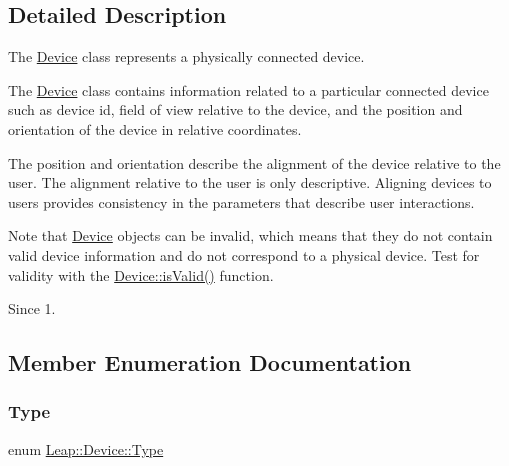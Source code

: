 \subsection{Detailed Description}
The \hyperlink{class_leap_1_1_device}{Device} class represents a physically connected device.

The \hyperlink{class_leap_1_1_device}{Device} class contains information related to a particular connected device such as device id, field of view relative to the device, and the position and orientation of the device in relative coordinates.

The position and orientation describe the alignment of the device relative to the user. The alignment relative to the user is only descriptive. Aligning devices to users provides consistency in the parameters that describe user interactions.

Note that \hyperlink{class_leap_1_1_device}{Device} objects can be invalid, which means that they do not contain valid device information and do not correspond to a physical device. Test for validity with the \hyperlink{class_leap_1_1_device_a3de3767cbfc2a4f24cefa99d363d15ea}{Device\+::is\+Valid()} function. \begin{DoxySince}{Since}
1. 
\end{DoxySince}


\subsection{Member Enumeration Documentation}
\mbox{\label{class_leap_1_1_device_a1b7477f6d382b15a77a00712a70628b2}} 
\subsubsection{\texorpdfstring{Type}{Type}}
{\footnotesize\ttfamily enum \hyperlink{class_leap_1_1_device_a1b7477f6d382b15a77a00712a70628b2}{Leap\+::\+Device\+::\+Type}}


